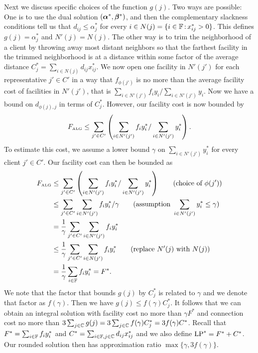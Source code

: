 \documentclass[oneside,final]{ucr}
\begin{document}
Next we discuss specific choices of the function $g(j)$. Two
ways are possible: One is to use the dual solution
$(\boldsymbol{\alpha}^\ast, \boldsymbol{\beta}^\ast)$, and then the complementary
slackness conditions tell us that $d_{ij} \leq
\alpha_j^\ast$ for every $i \in N(j) = \{i\in\mathbb{F}
{\,:\,} x_{ij}^\ast > 0\}$. This defines $g(j) =
\alpha_j^\ast$ and $N'(j) = N(j)$. The other way is to trim
the neighborhood of a client by throwing away most distant
neighbors so that the farthest facility in the trimmed
neighborhood is at a distance within some factor of the
average distance $C_j^\ast = \sum_{i\in N(j)} d_{ij}
x_{ij}^\ast$. We now open one facility in $N'(j')$ for each
representative $j' \in C'$ in a way that $f_{\phi(j')}$ is
no more than the average facility cost of facilities in
$N'(j')$, that is $\sum_{i\in N'(j')} f_i y_i / \sum_{i \in
  N'(j')} y_i$. Now we have a bound on $d_{\phi(j),j}$ in
terms of $C_j^\ast$. However, our facility cost is now
bounded by
\begin{equation*}
  F_{\mbox{\tiny\rm ALG}} \leq \sum_{j'\in C'} \left(\sum_{i\in N'(j')} f_i y_i^\ast /
    \sum_{i\in N'(j')} y_i^\ast\right).
\end{equation*}
To estimate this cost, we assume a lower bound $\gamma$ on
$\sum_{i\in N'(j')} y_i^\ast$ for every client $j' \in C'$.
Our facility cost can then be bounded as
\begin{align*}
  F_{\mbox{\tiny\rm ALG}} &\leq \sum_{j'\in C'} \left(\sum_{i\in
      N'(j')} f_i y_i^\ast /
    \sum_{i\in N'(j')} y_i^\ast\right) \qquad (\text{choice
    of } \phi(j'))\\
  &\leq \sum_{j'\in C'}
  \sum_{i \in N'(j')} f_i y_i^\ast /\gamma \qquad
  (\text{assumption } \sum_{i\in N'(j')} y_i^\ast \leq \gamma)\\
  &= \frac{1}{\gamma} \sum_{j' \in C'} \sum_{i \in N'(j')}
  f_i y_i^\ast\\
  &\leq \frac{1}{\gamma} \sum_{j' \in C'} \sum_{i \in N(j')}
  f_i y_i^\ast \qquad (\text{replace } N'(j) \text{ with } N(j))\\
  &=
  \frac{1}{\gamma} \sum_{i \in \mathbb{F}} f_i y_i^\ast = F^\ast.\\
\end{align*}
We note that the factor that bounds $g(j)$ by $C_j^\ast$ is
related to $\gamma$ and we denote that factor as
$f(\gamma)$. Then we have $g(j) \leq f(\gamma) C_j^\ast$. It
follows that we can obtain an integral solution with
facility cost no more than $\gamma F^\ast$ and connection
cost no more than $3 \sum_{j\in \mathbb{C}} g(j) = 3
\sum_{j\in \mathbb{C}} f(\gamma) C_j^\ast = 3 f(\gamma)
C^\ast$. Recall that $F^\ast = \sum_{i\in \mathbb{F}} f_i
y_i^\ast$ and $C^\ast = \sum_{i\in\mathbb{F}, j\in\mathbb{C}}
d_{ij} x_{ij}^\ast$ and we also define $\mbox{\rm LP}^\ast = F^\ast +
C^\ast$. Our rounded solution then has approximation ratio
$\max\{\gamma, 3 f(\gamma)\}$.
\end{document}

